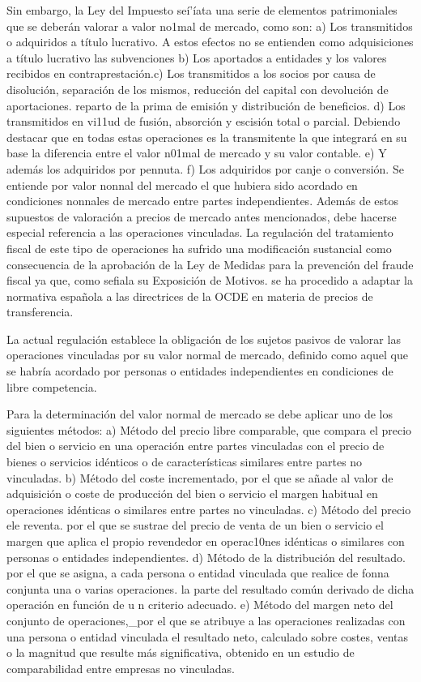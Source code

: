 \documentclass[10pt,a4paper]{article}
\begin{document}
Sin embargo, la Ley del Impuesto seí'íata una serie de elementos patrimoniales que se deberán valorar a valor no1mal de mercado, como son:
a) Los transmitidos o adquiridos a título lucrativo. A estos efectos no se entienden como adquisiciones a título lucrativo las subvenciones
b) Los aportados a entidades y los valores recibidos en contraprestación.c) Los transmitidos a los socios por causa de disolución, separación de los mismos, reducción del capital con devolución de aportaciones. reparto de la prima de emisión y distribución de beneficios.
d) Los transmitidos en vi11ud de fusión, absorción y escisión total o parcial. Debiendo destacar que en todas estas operaciones es la transmitente la que integrará en su base la diferencia entre el valor n01mal de mercado y su valor contable.
e) Y además los adquiridos por pennuta.
f) Los adquiridos por canje o conversión. Se entiende por valor nonnal del mercado el que hubiera sido acordado en condiciones nonnales de mercado entre partes independientes. Además de estos supuestos de valoración a precios de mercado antes mencionados, debe hacerse especial referencia a las operaciones vinculadas. La regulación del tratamiento fiscal de este tipo de operaciones ha sufrido una modificación sustancial como consecuencia de la aprobación de la Ley de Medidas para la prevención del fraude fiscal ya que, como sefiala su Exposición de Motivos. se ha procedido a adaptar la normativa española a las directrices de la OCDE en materia de precios de transferencia.

La actual regulación establece la obligación de los sujetos pasivos de valorar las operaciones vinculadas por su valor normal de mercado, definido como aquel que se habría acordado por personas o entidades independientes en condiciones de libre competencia.

Para la determinación del valor normal de mercado se debe aplicar uno de los siguientes métodos:
a) Método del precio libre comparable, que compara el precio del bien o servicio en una operación entre partes vinculadas con el precio de bienes o servicios idénticos o de características similares entre partes no vinculadas.
b) Método del coste incrementado, por el que se añade al valor de adquisición o coste de producción del bien o servicio el margen habitual en operaciones idénticas o similares entre partes no vinculadas.
c) Método del precio ele reventa. por el que se sustrae del precio de venta de un bien o servicio el margen que aplica el propio revendedor en operac10nes idénticas o similares con personas o entidades independientes.
d) Método de la distribución del resultado. por el que se asigna, a cada persona o entidad vinculada que realice de fonna conjunta una o varias operaciones. la parte del resultado común derivado de dicha operación en función de u n criterio adecuado.
e) Método del margen neto del conjunto de operaciones,_por el que se atribuye a las operaciones realizadas con una persona o entidad vinculada el resultado neto, calculado sobre costes, ventas o la magnitud que resulte más significativa, obtenido en un estudio de comparabilidad entre empresas no vinculadas.
\end{document}
